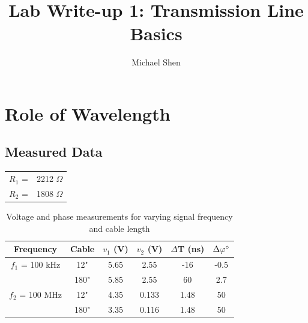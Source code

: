 \documentclass{article}
\begin{document}
\title{Lab Write-up 1: Transmission Line Basics}
\author{Michael Shen}
\maketitle

\section{Role of Wavelength}
\subsection{Measured Data}
\begin{table}[h]
\centering
	\begin{tabular}{rl}
	$R_{1}$ =  & 2212 $\Omega$  \\
	$R_{2}$ =  & 1808 $\Omega$      
	\end{tabular}
\end{table}

\begin{table}[H]
\centering
	\begin{tabular}{|c|c|c|c|c|c|}
	\hline
	\textbf{Frequency} & \textbf{Cable} & $v_1$ (V) & $v_2$ (V) & $\Delta$T (ns) & $\Delta\varphi\degree$ \\ \hline
	$f_{1}$ = 100 kHz  & 12"                & 5.65   & 2.55   & -16     & -0.5      \\ \hline
	                   & 180"               & 5.85   & 2.55   & 60      & 2.7       \\ \hline
	$f_{2}$ = 100 MHz  & 12"                & 4.35   & 0.133  & 1.48    & 50        \\ \hline
	                   & 180"               & 3.35   & 0.116  & 1.48    & 50        \\ \hline
	\end{tabular}
	\caption{Voltage and phase measurements for varying signal frequency and cable length}
	\label{Data 1}
\end{table}
\end{document}
